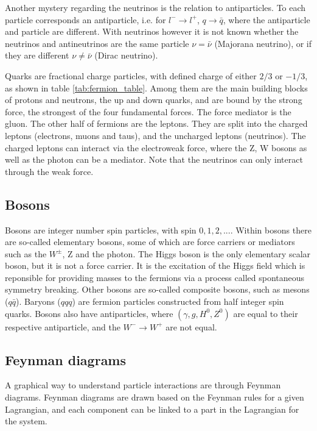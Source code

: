 Another mystery regarding the neutrinos is the relation to antiparticles. To each particle corresponds an antiparticle, i.e. for $l^-\to l^+$, $q\to \bar{q}$, where the antiparticle 
and particle are different. With neutrinos however it is not known whether the neutrinos and antineutrinos are the same particle $\nu = \bar{\nu}$ (Majorana neutrino), 
or if they are different $\nu \neq \bar{\nu}$ (Dirac neutrino).
\par
Quarks are fractional charge particles, with defined charge of either $2/3$ or $-1/3$, as shown in table \ref{tab:fermion_table}. Among them are the main building 
blocks of protons and neutrons, the up and down quarks, and are bound by the strong 
force, the strongest of the four fundamental forces. The force mediator is the gluon. The other half of fermions are the leptons. They are split into the charged 
leptons (electrons, muons and taus), and the uncharged leptons (neutrinos). The charged leptons can interact via the electroweak force, where the Z, W bosons 
as well as the photon can be a mediator. Note that the neutrinos can only interact through the weak force.

\subsection*{Bosons}
Bosons are integer number spin particles, with spin $0, 1, 2, ...$. Within bosons there are so-called elementary bosons, some 
of which are force carriers or mediators such as the $W^{\pm}$, Z and the photon. The Higgs boson is the only elementary scalar 
boson, but it is not a force carrier. It is the excitation of the Higgs field which is reponsible for providing masses to the 
fermions via a process called spontaneous symmetry breaking\cite{Pich:819632}. Other bosons are so-called composite bosons, such as mesons 
($q\bar{q}$). Baryons ($qqq$) are fermion particles constructed from half integer spin quarks. Bosons also have antiparticles, 
where $(\gamma, g, H^{0}, Z^{0})$ are equal to their respective antiparticle, and the $W^{-} \to W^{+}$ are not equal.

\subsection*{Feynman diagrams}
A graphical way to understand particle interactions are through Feynman diagrams. Feynman diagrams 
are drawn based on the Feynman rules for a given Lagrangian\cite{Pich:819632}\cite{feynrules}, 
and each component can be linked to a part in the Lagrangian for the system. 

